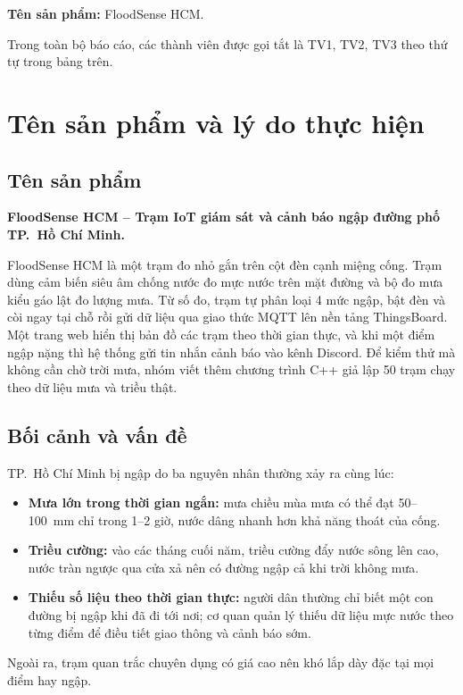 \documentclass[12pt,a4paper]{article}
\begin{document}
\noindent\textbf{Tên sản phẩm:} FloodSense HCM.

Trong toàn bộ báo cáo, các thành viên được gọi tắt là TV1, TV2, TV3 theo thứ tự trong bảng trên.

\section{Tên sản phẩm và lý do thực hiện}

\subsection{Tên sản phẩm}

\textbf{FloodSense HCM -- Trạm IoT giám sát và cảnh báo ngập đường phố TP.~Hồ Chí Minh.}

FloodSense HCM là một trạm đo nhỏ gắn trên cột đèn cạnh miệng cống. Trạm dùng cảm biến siêu âm chống nước đo mực nước trên mặt đường và bộ đo mưa kiểu gáo lật đo lượng mưa. Từ số đo, trạm tự phân loại 4 mức ngập, bật đèn và còi ngay tại chỗ rồi gửi dữ liệu qua giao thức MQTT lên nền tảng ThingsBoard. Một trang web hiển thị bản đồ các trạm theo thời gian thực, và khi một điểm ngập nặng thì hệ thống gửi tin nhắn cảnh báo vào kênh Discord. Để kiểm thử mà không cần chờ trời mưa, nhóm viết thêm chương trình C++ giả lập 50 trạm chạy theo dữ liệu mưa và triều thật.

\subsection{Bối cảnh và vấn đề}

TP.~Hồ Chí Minh bị ngập do ba nguyên nhân thường xảy ra cùng lúc:
\begin{itemize}
  \item \textbf{Mưa lớn trong thời gian ngắn:} mưa chiều mùa mưa có thể đạt 50--100~mm chỉ trong 1--2 giờ, nước dâng nhanh hơn khả năng thoát của cống.
  \item \textbf{Triều cường:} vào các tháng cuối năm, triều cường đẩy nước sông lên cao, nước tràn ngược qua cửa xả nên có đường ngập cả khi trời không mưa.
  \item \textbf{Thiếu số liệu theo thời gian thực:} người dân thường chỉ biết một con đường bị ngập khi đã đi tới nơi; cơ quan quản lý thiếu dữ liệu mực nước theo từng điểm để điều tiết giao thông và cảnh báo sớm.
\end{itemize}
Ngoài ra, trạm quan trắc chuyên dụng có giá cao nên khó lắp dày đặc tại mọi điểm hay ngập.
\end{document}
